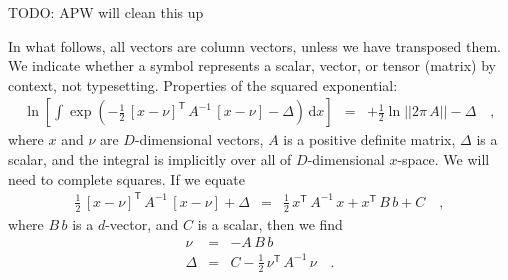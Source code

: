 \documentclass[manuscript, letterpaper]{aastex6}
\newcommand{\dd}{\mathrm{d}}
\newcommand{\transp}[1]{{#1}^{\!\mathsf{T}}}
\newcommand{\inv}[1]{{#1}^{-1}}
\newcommand{\todo}[1]{{\color{red}TODO: #1}}
\begin{document}
\todo{APW will clean this up}

In what follows, all vectors are column vectors, unless we have transposed them.
We indicate whether a symbol represents a scalar, vector, or tensor
(matrix) by context, not typesetting.
Properties of the squared exponential:
\begin{eqnarray}
  \ln\left[\int\exp(-\frac{1}{2}\,\transp{[x-\nu]}\,\inv{A}\,[x-\nu] - \Delta)\,\dd x\right]
  &=& +\frac{1}{2}\ln ||2\pi\,A|| -\Delta
  \quad ,
\end{eqnarray}
where $x$ and $\nu$ are $D$-dimensional vectors, $A$ is a positive definite
matrix, $\Delta$ is a scalar, and the integral is implicitly over all
of $D$-dimensional $x$-space.
We will need to complete squares.
If we equate
\begin{eqnarray}
  \frac{1}{2}\,\transp{[x-\nu]}\,\inv{A}\,[x-\nu] + \Delta
  &=& \frac{1}{2}\,\transp{x}\,\inv{A}\,x + \transp{x}\,B\,b + C
  \quad ,
\end{eqnarray}
where $B\,b$ is a $d$-vector, and $C$ is a scalar, then we find
\begin{eqnarray}
  \nu &=& -A\,B\,b
  \\
  \Delta & = & C - \frac{1}{2}\,\transp{\nu}\,\inv{A}\,\nu
  \quad .
\end{eqnarray}
\end{document}
